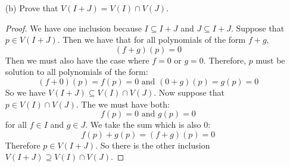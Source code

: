 \documentclass{article}
\begin{document}
\begin{itemize}
        \item [(b)] Prove that $V(I + J) = V(I) \cap V(J)$. 
            \begin{proof}
                We have one inclusion because $I \subseteq I + J$ and $J \subseteq I + J$. Suppose that $p \in V(I + J)$. Then we have that for all polynomials of the form $f + g$, 
                    \begin{equation*}
                        (f + g)(p) = 0
                    \end{equation*}
                Then we must also have the case where $f = 0$ or $g = 0$. Therefore, $p$ must be solution to all polynomials of the form:
                    \begin{equation*}
                        (f + 0)(p) = f(p) = 0 \text{ and } (0 + g)(p) = g(p) = 0
                    \end{equation*}
                So we have $V(I + J) \subseteq V(I) \cap V(J)$. Now suppose that $p \in V(I) \cap V(J)$. The we must have both:
                    \begin{equation*}
                        f(p) = 0 \text{ and } g(p) = 0
                    \end{equation*}
                for all $f \in I$ and $g \in J$. We take the sum which is also $0$:
                    \begin{equation*}
                        f(p) + g(p) = (f + g)(p) = 0
                    \end{equation*}
                Therefore $p \in V(I + J)$. So there is the other inclusion $V(I + J) \supseteq V(I) \cap V(J)$.
            \end{proof}
    \end{itemize}
\end{document}
